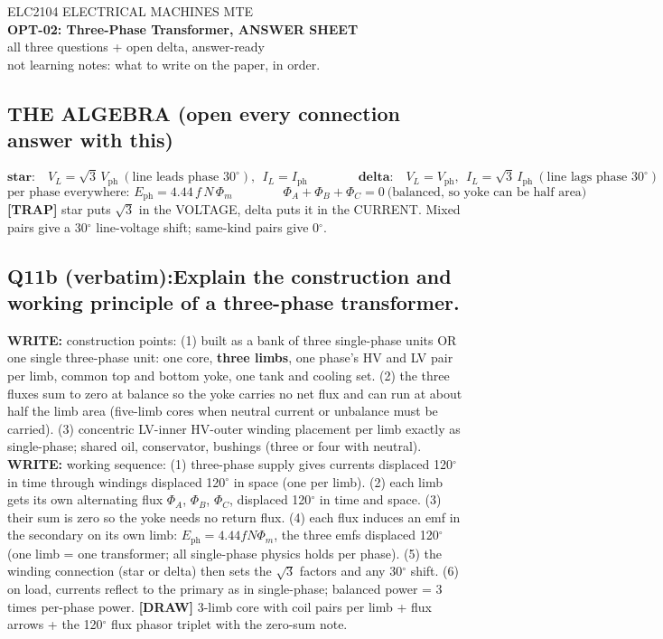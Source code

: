 \documentclass[11pt]{article}
\newcommand{\q}[2]{\subsection*{\color{copper}#1\quad\color{iron}#2}}
\newcommand{\w}[1]{\textbf{\color{copper}WRITE:} #1}
\newcommand{\tr}[1]{\textbf{\color{red}[TRAP]} #1}
\newcommand{\dw}[1]{\textbf{\color{muted}[DRAW]} #1}
\begin{document}
\begin{center}
{\footnotesize\color{copper} ELC2104 \textbar{} ELECTRICAL MACHINES \textbar{} MTE}\\[6pt]
{\LARGE\bfseries\color{iron} OPT-02: Three-Phase Transformer, ANSWER SHEET}\\[2pt]
{\Large\color{copper} all three questions + open delta, answer-ready}\\[6pt]
{\footnotesize\color{muted} not learning notes: what to write on the paper, in order.}
\end{center}

\hrulefill
\subsection*{\color{copper}THE ALGEBRA (open every connection answer with this)}
\[
\textbf{star:}\quad V_L = \sqrt{3}\, V_{\text{ph}}\ (\text{line leads phase } 30^{\circ}),\ \ I_L = I_{\text{ph}}
\qquad\qquad
\textbf{delta:}\quad V_L = V_{\text{ph}},\ \ I_L = \sqrt{3}\, I_{\text{ph}}\ (\text{line lags phase } 30^{\circ})
\]
\[
\text{per phase everywhere: } E_{\text{ph}} = 4.44\, f\, N\, \Phi_m
\qquad\qquad
\Phi_A + \Phi_B + \Phi_C = 0\ \text{(balanced, so yoke can be half area)}
\]
\tr{star puts $\sqrt{3}$ in the VOLTAGE, delta puts it in the CURRENT. Mixed pairs give a 30$^\circ$ line-voltage shift; same-kind pairs give 0$^\circ$.}

\q{Q11b (verbatim):}{Explain the construction and working principle of a three-phase transformer.}
\w{construction points:} (1) built as a bank of three single-phase units OR one single three-phase unit: one core, \textbf{three limbs}, one phase's HV and LV pair per limb, common top and bottom yoke, one tank and cooling set. (2) the three fluxes sum to zero at balance so the yoke carries no net flux and can run at about half the limb area (five-limb cores when neutral current or unbalance must be carried). (3) concentric LV-inner HV-outer winding placement per limb exactly as single-phase; shared oil, conservator, bushings (three or four with neutral).
\w{working sequence:} (1) three-phase supply gives currents displaced 120$^\circ$ in time through windings displaced 120$^\circ$ in space (one per limb). (2) each limb gets its own alternating flux $\Phi_A$, $\Phi_B$, $\Phi_C$, displaced 120$^\circ$ in time and space. (3) their sum is zero so the yoke needs no return flux. (4) each flux induces an emf in the secondary on its own limb: $E_{\text{ph}} = 4.44 f N \Phi_m$, the three emfs displaced 120$^\circ$ (one limb = one transformer; all single-phase physics holds per phase). (5) the winding connection (star or delta) then sets the $\sqrt{3}$ factors and any 30$^\circ$ shift. (6) on load, currents reflect to the primary as in single-phase; balanced power = 3 times per-phase power.
\dw{3-limb core with coil pairs per limb + flux arrows + the 120$^\circ$ flux phasor triplet with the zero-sum note.}
\end{document}

